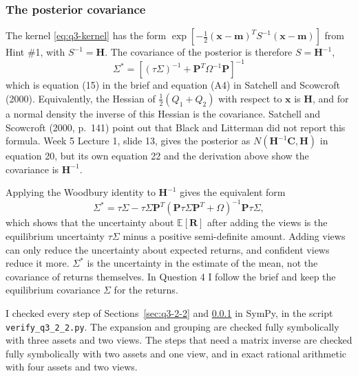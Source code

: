 \documentclass[11pt]{article}
\numberwithin{equation}{section}
\begin{document}
\subsubsection{The posterior covariance}
\label{sec:q3-2-3}

The kernel \eqref{eq:q3-kernel} has the form $\exp\left[-\frac{1}{2}(\bm{x} - \bm{m})^{T}S^{-1}(\bm{x} - \bm{m})\right]$ from Hint \#1, with $S^{-1} = \bm{H}$. The covariance of the posterior is therefore $S = \bm{H}^{-1}$,
\begin{equation}
  \boxed{\;\Sigma^{*} = \left[(\tau\Sigma)^{-1} + \bm{P}^{T}\Omega^{-1}\bm{P}\right]^{-1}\;}
  \label{eq:q3-cov}
\end{equation}
which is equation (15) in the brief and equation (A4) in Satchell and Scowcroft (2000). Equivalently, the Hessian of $\frac{1}{2}(Q_{1} + Q_{2})$ with respect to $\bm{x}$ is $\bm{H}$, and for a normal density the inverse of this Hessian is the covariance. Satchell and Scowcroft (2000, p.~141) point out that Black and Litterman did not report this formula. Week 5 Lecture 1, slide 13, gives the posterior as $N(\bm{H}^{-1}\bm{C}, \bm{H})$ in equation 20, but its own equation 22 and the derivation above show the covariance is $\bm{H}^{-1}$.

Applying the Woodbury identity to $\bm{H}^{-1}$ gives the equivalent form
\begin{equation*}
  \Sigma^{*} = \tau\Sigma - \tau\Sigma\bm{P}^{T}\left(\bm{P}\tau\Sigma\bm{P}^{T} + \Omega\right)^{-1}\bm{P}\tau\Sigma,
\end{equation*}
which shows that the uncertainty about $\mathbb{E}[\bm{R}]$ after adding the views is the equilibrium uncertainty $\tau\Sigma$ minus a positive semi-definite amount. Adding views can only reduce the uncertainty about expected returns, and confident views reduce it more. $\Sigma^{*}$ is the uncertainty in the estimate of the mean, not the covariance of returns themselves. In Question 4 I follow the brief and keep the equilibrium covariance $\Sigma$ for the returns.

I checked every step of Sections~\ref{sec:q3-2-2} and \ref{sec:q3-2-3} in SymPy, in the script \texttt{verify\_q3\_2\_2.py}. The expansion and grouping are checked fully symbolically with three assets and two views. The steps that need a matrix inverse are checked fully symbolically with two assets and one view, and in exact rational arithmetic with four assets and two views.

\end{document}
